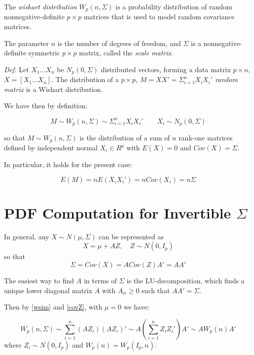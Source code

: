 \documentclass[12pt,openright,twoside,a4paper]{book}
\begin{document}
The \textit{wishart distribution} $ W_p(n, \Sigma)$ is a probability distribution of random nonnegative-definite $p\times p$ matrices that is used to model random covariance matrices.

The parameter $n$ is the number of degrees of freedom, and $\Sigma$ is a nonnegative-definite symmetric $p\times p$ matrix, called the \textit{scale matrix}.


\textit{Def.} Let $X_1...X_n$ be $N_p(0,\Sigma)$ distribuited vectors, forming a data matrix $p\times n$, $X=[X_1...X_n]$.
The distribution of  a $p\times p$, $M=XX'=\Sigma^n_{i=1}X_iX_i'$ \textit{random matrix}  is a Wishart distribution. \cite{AMS}

We have then by definition:

\begin{equation}
M\sim W_p(n, \Sigma)\sim\Sigma^n_{i=1}X_iX_i' \qquad X_i\sim N_p(0,\Sigma)   
\label{wsim}
\end{equation}


so that $M\sim W_p(n, \Sigma)$  is the distribution of a sum of $n$ rank-one matrices defined by independent normal $X_i \in R^p$ with $E(X)=0$ and $Cov(X)=\Sigma$.

In particular, it holds for the present case:

\begin{equation}
E(M)=nE(X_iX_i') = nCov(X_i) = n\Sigma
\end{equation}

\section{PDF Computation for Invertible $\Sigma$}

In general, any $X\sim N(\mu,\Sigma)$ can be represented as
\begin{equation}
X=\mu + AZ,\quad Z\sim N(0,I_p)
\end{equation}
so that
\begin{equation}
\Sigma= Cov(X) = A Cov(Z)A' = AA'
\label{covZ}
\end{equation}


The easiest way to find $ A$ in terms of $\Sigma$ is the LU-decomposition, which finds a unique lower diagonal matrix $A$ with $A_{ii} \geqslant 0 $ such that $AA' = \Sigma$.

Then by \ref{wsim} and \ref{covZ}, with $\mu=0$ we have:

\begin{equation}
W_p(n, \Sigma)\sim \sum_{i=1}^n(AZ_i)(AZ_i)'\sim A(\sum_{i=1}^nZ_iZ_i')A'\sim AW_p(n)A'
\end{equation}
where $Z_i\sim N(0, I_p)$ and $W_p(n)=W_p(I_p,n)$. 
\end{document}
